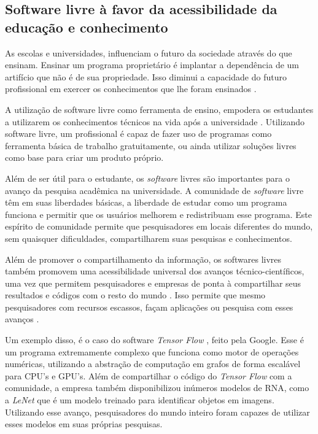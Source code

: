 \subsection{Software livre à favor da acessibilidade da educação e conhecimento}

As escolas e universidades, influenciam o futuro da sociedade através do que ensinam. Ensinar um programa proprietário é implantar a dependência de um artifício que não é de sua propriedade. Isso diminui a capacidade do futuro profissional em exercer os conhecimentos que lhe foram ensinados \cite{RichardStallman}.  

A utilização de software livre como ferramenta de ensino, empodera os estudantes a utilizarem os conhecimentos técnicos na vida após a universidade \cite{Lessig2002}. Utilizando software livre, um profissional é capaz de fazer uso de programas como ferramenta básica de trabalho gratuitamente, ou ainda utilizar soluções livres como base para criar um produto próprio.

Além de ser útil para o estudante, os \textit{software} livres são importantes para o avanço da pesquisa acadêmica na universidade. A comunidade de \textit{software} livre têm em suas liberdades básicas, a liberdade de estudar como um programa funciona e permitir que os usuários melhorem e redistribuam esse programa. Este espírito de comunidade permite que pesquisadores em locais diferentes do mundo, sem quaisquer dificuldades, compartilharem suas pesquisas e conhecimentos.  

Além de promover o compartilhamento da informação, os softwares livres também promovem uma  acessibilidade universal dos avanços técnico-científicos, uma vez que permitem pesquisadores e empresas de ponta à compartilhar seus resultados e códigos com o resto do mundo \cite{Lessig2002}. Isso permite que mesmo pesquisadores com recursos escassos, façam aplicações ou pesquisa com esses avanços .

Um exemplo disso, é o caso do software \textit{Tensor Flow} \cite{AbadiABBCCCDDDG16}, feito pela Google. Esse é um programa extremamente complexo que funciona como motor de operações numéricas, utilizando a abstração de computação em grafos de forma escalável para CPU's e GPU's. Além de compartilhar o código do \textit{Tensor Flow} com a comunidade, a empresa também disponibilizou inúmeros modelos de RNA, como a \textit{LeNet} \cite{szegedy2015going} que é um modelo treinado para identificar objetos em imagens. Utilizando esse avanço, pesquisadores do mundo inteiro foram capazes de utilizar esses modelos em suas próprias pesquisas.








